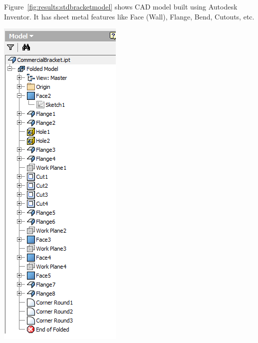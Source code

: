 \begin{minipage}{\linewidth}
\begin{minipage}[c]{0.62\linewidth}
Figure~\ref{fig:results:stdbracketmodel} shows CAD model built using Autodesk Inventor. It has sheet metal features like Face (Wall), Flange, Bend, Cutouts, etc.
\end{minipage}
\quad
\begin{minipage}[c]{0.3\linewidth}
\includegraphics[width=\linewidth,valign=t]{../Common/images/CommercialBracket_tree}
 \label{fig:results:stdbrackettree}
\end{minipage}
\end{minipage}

